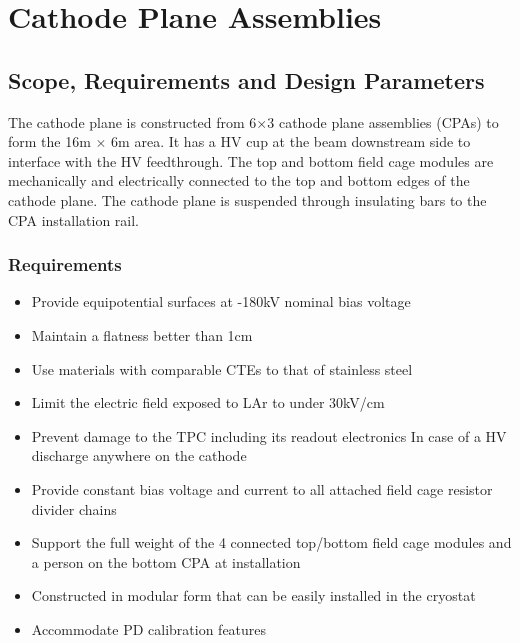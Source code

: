 


\section{Cathode Plane Assemblies}


\subsection{Scope, Requirements and Design Parameters}

The cathode plane is constructed from 6$\times$3 cathode plane assemblies (CPAs) to form the 16m $\times$ 6m area.  It has a HV cup at the beam downstream side to interface with the HV feedthrough. The top and bottom field cage modules are mechanically and electrically connected to the top and bottom edges of the cathode plane.  The cathode plane is suspended through insulating bars to the CPA installation rail.

\subsubsection{Requirements}

\begin{itemize}
\item Provide equipotential surfaces at -180kV nominal bias voltage
\item Maintain a flatness better than 1cm
\item Use materials with comparable CTEs to that of stainless steel 
\item Limit the electric field exposed to LAr to under 30kV/cm
\item Prevent damage to the TPC including its readout electronics In case of a HV discharge anywhere on the cathode
\item Provide constant bias voltage and current to all attached field cage resistor divider chains
\item Support the full weight of the 4 connected top/bottom field cage modules and a person on the bottom CPA at installation
\item Constructed in modular form that can be easily installed in the cryostat
\item Accommodate PD calibration features

\end{itemize}

